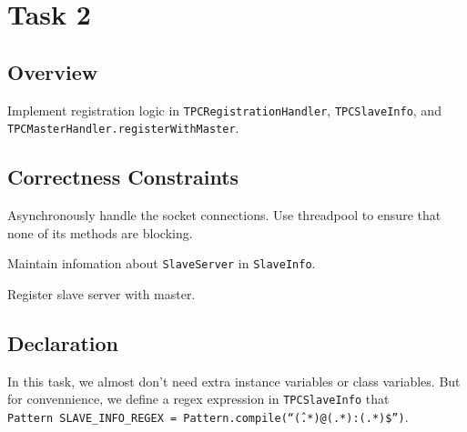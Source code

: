\documentclass{article}
\begin{document}
\section{Task 2}
\subsection{Overview}
Implement registration logic in \texttt{TPCRegistrationHandler}, \texttt{TPCSlaveInfo}, and 
\texttt{TPCMasterHandler.registerWithMaster}.
\subsection{Correctness Constraints}
\begin{compactitem}
	\item Asynchronously handle the socket connections. Use threadpool to ensure that none of its methods are
		blocking.
	\item Maintain infomation about \texttt{SlaveServer} in \texttt{SlaveInfo}.
	\item Register slave server with master. 
\end{compactitem}
\subsection{Declaration}
In this task, we almost don't need extra instance variables or class variables. But for convennience,
we define a regex expression in \texttt{TPCSlaveInfo} that  \\
\texttt{Pattern SLAVE\_INFO\_REGEX = Pattern.compile(``\^(.*)@(.*):(.*)\$'')}.
\end{document}
